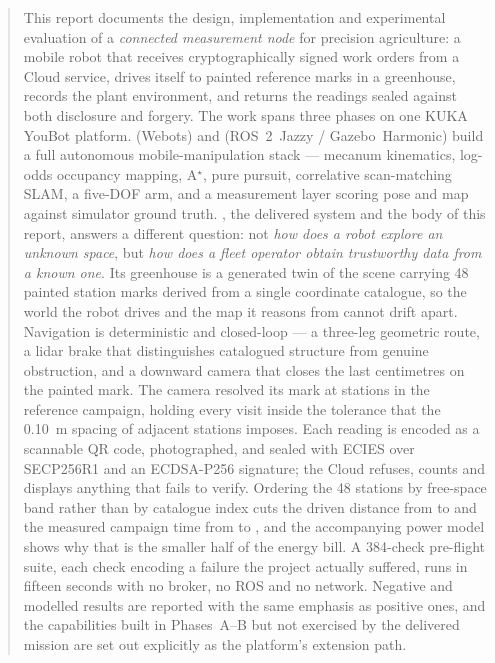 \documentclass[conference]{IEEEtran}
\begin{document}
\begin{abstract}
This report documents the design, implementation and experimental
evaluation of a \emph{connected measurement node} for precision
agriculture: a mobile robot that receives cryptographically signed work
orders from a Cloud service, drives itself to painted reference marks in
a greenhouse, records the plant environment, and returns the readings
sealed against both disclosure and forgery. The work spans three phases
on one KUKA YouBot platform. \phaseA{} (Webots) and \phaseB{}
(ROS~2~Jazzy / Gazebo~Harmonic) build a full autonomous
mobile-manipulation stack --- mecanum kinematics, log-odds occupancy
mapping, A$^\star$, pure pursuit, correlative scan-matching SLAM, a
five-DOF arm, and a measurement layer scoring pose and map against
simulator ground truth. \phaseC{}, the delivered system and the body of
this report, answers a different question: not \emph{how does a robot
explore an unknown space}, but \emph{how does a fleet operator obtain
trustworthy data from a known one}. Its greenhouse is a generated twin
of the \phaseB{} scene carrying 48 painted station marks derived from a
single coordinate catalogue, so the world the robot drives and the map
it reasons from cannot drift apart. Navigation is deterministic and
closed-loop --- a three-leg geometric route, a lidar brake that
distinguishes catalogued structure from genuine obstruction, and a
downward camera that closes the last centimetres on the painted mark.
The camera resolved its mark at  stations in the
reference campaign, holding every visit inside the 
tolerance that the 0.10~m spacing of adjacent stations imposes.
Each reading is encoded as a scannable
QR code, photographed, and sealed with ECIES over SECP256R1 and an
ECDSA-P256 signature; the Cloud refuses, counts and displays anything
that fails to verify. Ordering the 48 stations by free-space band rather
than by catalogue index cuts the driven distance from
 to  and the measured campaign time from
 to , and the accompanying power model
shows why that is the smaller half of the energy bill. A 384-check
pre-flight suite, each check encoding a failure the project actually
suffered, runs in fifteen seconds with no broker, no ROS and no network.
Negative and modelled results are reported with the same emphasis as
positive ones, and the capabilities built in Phases~A--B but not
exercised by the delivered mission are set out explicitly as the
platform's extension path.
\end{abstract}
\end{document}
